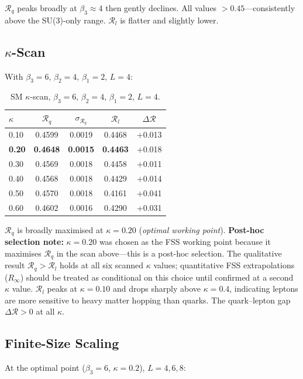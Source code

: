 \documentclass[12pt,a4paper]{article}
\newcommand{\R}{\mathcal{R}}           %
\theoremstyle{plain}
\theoremstyle{definition}
\theoremstyle{remark}
\begin{document}
$\R_q$ peaks broadly at $\beta_3\approx4$ then gently declines.
All values $>0.45$---consistently above the SU(3)-only range.
$\R_l$ is flatter and slightly lower.

\subsection{$\kappa$-Scan}

With $\beta_3=6$, $\beta_2=4$, $\beta_1=2$, $L=4$:

\begin{table}[ht]
\centering
\caption{SM $\kappa$-scan, $\beta_3=6$, $\beta_2=4$, $\beta_1=2$, $L=4$.}
\label{tab:sm_kscan}
\begin{tabular}{lcccc}
\toprule
$\kappa$ & $\R_q$ & $\sigma_{\R_q}$ & $\R_l$ & $\Delta\R$ \\
\midrule
0.10 & 0.4599 & 0.0019 & 0.4468 & +0.013 \\
\textbf{0.20} & \textbf{0.4648} & \textbf{0.0015} & \textbf{0.4463} & +0.018 \\
0.30 & 0.4569 & 0.0018 & 0.4458 & +0.011 \\
0.40 & 0.4568 & 0.0018 & 0.4429 & +0.014 \\
0.50 & 0.4570 & 0.0018 & 0.4161 & +0.041 \\
0.60 & 0.4602 & 0.0016 & 0.4290 & +0.031 \\
\bottomrule
\end{tabular}
\end{table}

$\R_q$ is broadly maximised at $\kappa=0.20$ (\emph{optimal working point}).
\textbf{Post-hoc selection note:} $\kappa=0.20$ was chosen as the FSS working point
because it maximises $\R_q$ in the scan above---this is a post-hoc selection.
The qualitative result $\R_q>\R_l$ holds at all six scanned $\kappa$ values;
quantitative FSS extrapolations ($R_\infty$) should be treated as conditional on this
choice until confirmed at a second $\kappa$ value.
$\R_l$ peaks at $\kappa=0.10$ and drops sharply above $\kappa=0.4$, indicating
leptons are more sensitive to heavy matter hopping than quarks.
The quark--lepton gap $\Delta\R>0$ at all $\kappa$.

\subsection{Finite-Size Scaling}
\label{sec:smfss}

At the optimal point ($\beta_3=6$, $\kappa=0.2$), $L=4,6,8$:
\end{document}
